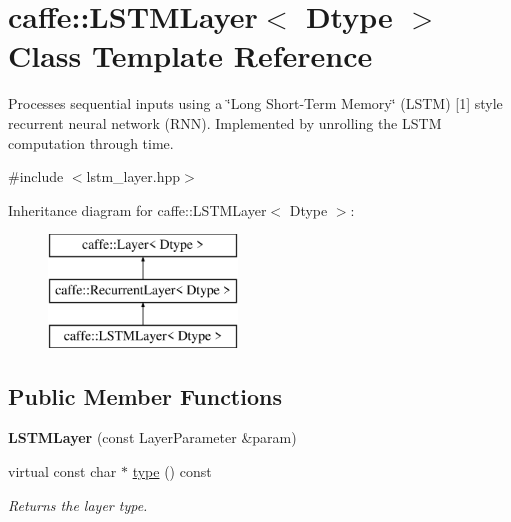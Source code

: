 \hypertarget{classcaffe_1_1LSTMLayer}{}\section{caffe\+:\+:L\+S\+T\+M\+Layer$<$ Dtype $>$ Class Template Reference}
\label{classcaffe_1_1LSTMLayer}


Processes sequential inputs using a \char`\"{}\+Long Short-\/\+Term Memory\char`\"{} (L\+S\+TM) \mbox{[}1\mbox{]} style recurrent neural network (R\+NN). Implemented by unrolling the L\+S\+TM computation through time.  




{\ttfamily \#include $<$lstm\+\_\+layer.\+hpp$>$}

Inheritance diagram for caffe\+:\+:L\+S\+T\+M\+Layer$<$ Dtype $>$\+:\begin{figure}[H]
\begin{center}
\leavevmode
\includegraphics[height=3.000000cm]{classcaffe_1_1LSTMLayer}
\end{center}
\end{figure}
\subsection*{Public Member Functions}
\begin{DoxyCompactItemize}
\item 
{\bfseries L\+S\+T\+M\+Layer} (const Layer\+Parameter \&param)\hypertarget{classcaffe_1_1LSTMLayer_abcf1a46aef1f25b7a78d13dc7e34f13b}{}\label{classcaffe_1_1LSTMLayer_abcf1a46aef1f25b7a78d13dc7e34f13b}

\item 
virtual const char $\ast$ \hyperlink{classcaffe_1_1LSTMLayer_ab427faecd6e35031780a6146df62b1c5}{type} () const \hypertarget{classcaffe_1_1LSTMLayer_ab427faecd6e35031780a6146df62b1c5}{}\label{classcaffe_1_1LSTMLayer_ab427faecd6e35031780a6146df62b1c5}

\begin{DoxyCompactList}\small\item\em Returns the layer type. \end{DoxyCompactList}\end{DoxyCompactItemize}
